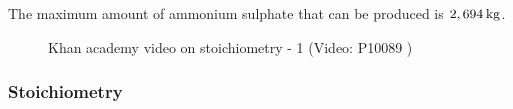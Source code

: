 {\begin{mdframed}[linewidth=4, leftmargin=40, rightmargin=40]
\begin{exercise}
\begin{enumerate}[noitemsep, label=\textbf{Step} \textbf{\arabic*}. ]
      \par 
      \label{m38712*id285362}The maximum amount of ammonium sulphate that can be produced is \begin{math}2,694\phantom{\rule{2pt}{0ex}}\mathrm{kg}\end{math}.
 \par 
      \end{enumerate}
         

    \end{exercise}
    \end{mdframed}
    }
    \noindent
  
\label{m38712*eip-546}
    \setcounter{subfigure}{0}


	\begin{figure}[H] %
    
    
    \textnormal{Khan academy video on stoichiometry - 1}\vspace{.1in} \nopagebreak
  \label{m38712*yt-media4}\label{m38712*yt-video4}
             { (Video:  P10089 )}
      
      \vspace{2pt}
    \vspace{.1in}
    
    

 \end{figure}   

    \addtocounter{footnote}{-0}
    \par \label{m38712*secfhsst!!!underscore!!!id2276}
            \subsubsection{  Stoichiometry
      }
            \nopagebreak
            
